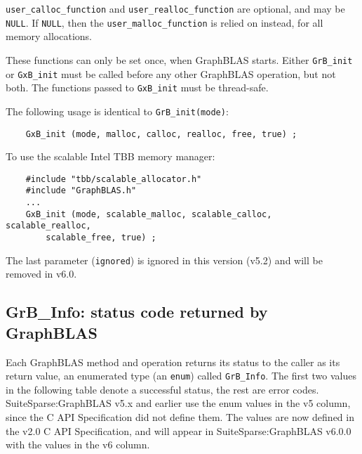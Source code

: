 \documentclass[12pt]{article}
\begin{document}
\verb'user_calloc_function' and \verb'user_realloc_function' are optional, and
may be \verb'NULL'.  If \verb'NULL', then the \verb'user_malloc_function' is
relied on instead, for all memory allocations.

These functions can only be set once, when GraphBLAS starts.   Either
\verb'GrB_init' or \verb'GxB_init' must be called before any other GraphBLAS
operation, but not both.  The functions passed to \verb'GxB_init' must be
thread-safe.

The following usage is identical to \verb'GrB_init(mode)':

    {\footnotesize
    \begin{verbatim}
    GxB_init (mode, malloc, calloc, realloc, free, true) ; \end{verbatim}}

To use the scalable Intel TBB memory manager:

    {\footnotesize
    \begin{verbatim}
    #include "tbb/scalable_allocator.h"
    #include "GraphBLAS.h"
    ...
    GxB_init (mode, scalable_malloc, scalable_calloc, scalable_realloc,
        scalable_free, true) ; \end{verbatim}}

The last parameter (\verb'ignored') is ignored in this version (v5.2)
and will be removed in v6.0.

\newpage
\subsection{{\sf GrB\_Info:} status code returned by GraphBLAS} %
\label{info}

Each GraphBLAS method and operation returns its status to the caller as its
return value, an enumerated type (an \verb'enum') called \verb'GrB_Info'.  The
first two values in the following table denote a successful status, the rest
are error codes.  SuiteSparse:GraphBLAS v5.x and earlier use the enum values
in the v5 column, since the C API Specification did not define them.
The values are now defined in the v2.0 C API Specification, and will appear
in SuiteSparse:GraphBLAS v6.0.0 with the values in the v6 column.
\end{document}
